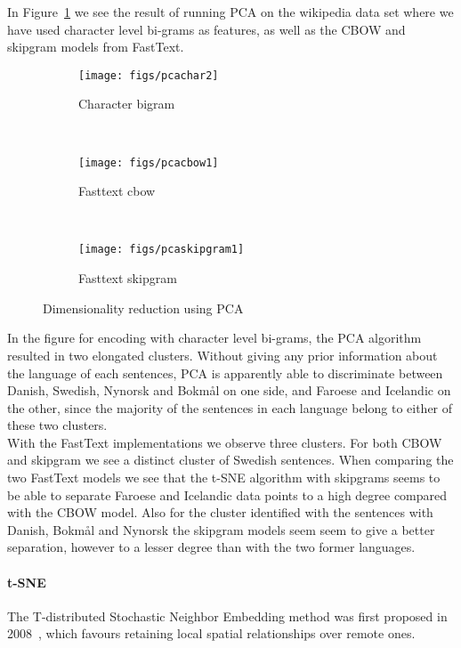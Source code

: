 \documentclass[11pt,a4paper]{article}
\begin{document}
In Figure~\ref{pca} we see the result of running  PCA  on the wikipedia data set where we have used character level bi-grams as features, as well as the CBOW and skipgram models from FastText.


\begin{figure}
    \centering
    \begin{subfigure}[b]{0.47\textwidth}
      \centering

        \texttt{[image: figs/pcachar2]}
        \caption{Character bigram}
    \end{subfigure}
    ~
    \begin{subfigure}[b]{0.47\textwidth}
          \centering
\texttt{[image: figs/pcacbow1]}
        \caption{Fasttext cbow}
    \end{subfigure}
    ~
    \begin{subfigure}[b]{0.47\textwidth}
          \centering
\texttt{[image: figs/pcaskipgram1]}
        \caption{Fasttext skipgram}
    \end{subfigure}
    \caption{Dimensionality reduction using PCA}
    \label{pca}
\end{figure}

In the figure for encoding with character level bi-grams, the PCA algorithm resulted in two elongated clusters. Without giving any prior information about the language of each sentences, PCA is apparently able to discriminate between Danish, Swedish, Nynorsk and Bokmål on one side, and Faroese and Icelandic on the other, since the majority of the sentences in each language belong to either of these two clusters. \\

With the FastText implementations we observe three clusters. For both CBOW and skipgram we see a distinct cluster of Swedish sentences. When comparing the two FastText models we see that the t-SNE algorithm with skipgrams seems to be able to separate  Faroese and Icelandic data points to a high degree compared with the CBOW model. Also for the cluster identified with the sentences with Danish, Bokmål and Nynorsk the skipgram models seem seem to give a better separation, however to a lesser degree than with the two former languages.

\paragraph{t-SNE}

The T-distributed Stochastic Neighbor Embedding method was first proposed in 2008~\cite{tsne}, which favours retaining local spatial relationships over remote ones.
\end{document}
